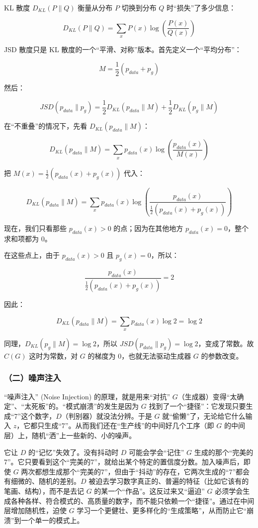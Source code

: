 KL 散度 \(D_{KL}(P\parallel Q)\) 衡量从分布 \(P\) 切换到分布 \(Q\) 时``损失''了多少信息：

\[
D_{KL}(P\parallel Q)=\sum_x P(x)\log\left(\frac{P(x)}{Q(x)}\right)
\]

JSD 散度只是 KL 散度的一个``平滑、对称''版本。首先定义一个``平均分布''：

\[
M=\frac{1}{2}(p_{data}+p_g)
\]

然后：

\[
JSD(p_{data}\parallel p_g)=\frac{1}{2}D_{KL}(p_{data}\parallel M)+\frac{1}{2}D_{KL}(p_g\parallel M)
\]

在``不重叠''的情况下，先看 \(D_{KL}(p_{data}\parallel M)\)：

\[
D_{KL}(p_{data}\parallel M)=\sum_x p_{data}(x)\log\left(\frac{p_{data}(x)}{M(x)}\right)
\]

把 \(M(x)=\frac{1}{2}(p_{data}(x)+p_g(x))\) 代入：

\[
D_{KL}(p_{data}\parallel M)=\sum_x p_{data}(x)\log\left(\frac{p_{data}(x)}{\frac{1}{2}(p_{data}(x)+p_g(x))}\right)
\]

现在，我们只看那些 \(p_{data}(x)>0\) 的点；因为在其他地方 \(p_{data}(x)=0\)，整个求和项都为 0。

在这些点上，由于 \(p_{data}(x)>0\) 且 \(p_g(x)=0\)，所以：

\[
\frac{p_{data}(x)}{\frac{1}{2}(p_{data}(x)+p_g(x))}=2
\]

因此：

\[
D_{KL}(p_{data}\parallel M)=\sum_x p_{data}(x)\log 2=\log 2
\]

同理，\(D_{KL}(p_g\parallel M)=\log 2\)，所以 \(JSD(p_{data}\parallel p_g)=\log 2\)，变成了常数。故 \(C(G)\) 这时为常数，对 \(G\) 的梯度为 0，也就无法驱动生成器 \(G\) 的参数改变。

\hypertarget{ux4e8cux566aux58f0ux6ce8ux5165}{%
\subsubsection{（二）噪声注入}\label{ux4e8cux566aux58f0ux6ce8ux5165}}

``噪声注入'' (Noise Injection) 的原理，就是用来``对抗'' \(G\)（生成器）变得``太确定''、``太死板''的。``模式崩溃''的发生是因为 \(G\) 找到了一个``捷径''：它发现只要生成``7''这个数字，\(D\)（判别器）就没法分辨。于是 \(G\) 就``偷懒''了，无论给它什么输入 \(z\)，它都只生成``7''。从而我们还在``生产线''的中间好几个工序（即 \(G\) 的中间层）上，随机``洒''上一些新的、小的噪声。

它让 \(D\) 的``记忆''失效了。没有抖动时 \(D\) 可能会学会``记住'' \(G\) 生成的那个``完美的7''。它只要看到这个``完美的7''，就给出某个特定的置信度分数。加入噪声后，即使 \(G\) 两次都想生成那个``完美的7''，但由于``抖动''的存在，它两次生成的``7''都会有细微的、随机的差别。\(D\) 被迫去学习数字真正的、普遍的特征（比如它该有的笔画、结构），而不是去记 \(G\) 的某一个``作品''。这反过来又``逼迫'' \(G\) 必须学会生成各种各样、符合模式的、高质量的数字，而不能只依赖一个``捷径''。通过在中间层增加随机性，迫使 \(G\) 学习一个更健壮、更多样化的``生成策略''，从而防止它``崩溃''到一个单一的模式上。

